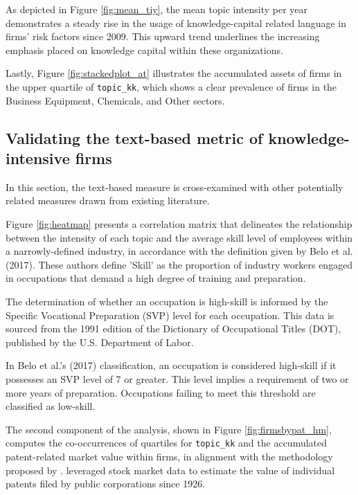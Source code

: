 \documentclass[12pt, letterpaper]{article}
\begin{document}


As depicted in Figure \ref{fig:mean_tiy}, the mean topic intensity per year demonstrates a steady rise in the usage of knowledge-capital related language in firms' risk factors since 2009. This upward trend underlines the increasing emphasis placed on knowledge capital within these organizations.

Lastly, Figure \ref{fig:stackedplot_at} illustrates the accumulated assets of firms in the upper quartile of \texttt{topic\_kk}, which shows a clear prevalence of firms in the Business Equipment, Chemicals, and Other sectors.


\subsection{Validating the text-based metric of knowledge-intensive firms}
  
In this section, the text-based measure \tkk  is cross-examined with other potentially related measures drawn from existing literature.

Figure \ref{fig:heatmap} presents a correlation matrix that delineates the relationship between the intensity of each topic and the average skill level of employees within a narrowly-defined industry, in accordance with the definition given by Belo et al. (2017). These authors define 'Skill' as the proportion of industry workers engaged in occupations that demand a high degree of training and preparation.

The determination of whether an occupation is high-skill is informed by the Specific Vocational Preparation (SVP) level for each occupation. This data is sourced from the 1991 edition of the Dictionary of Occupational Titles (DOT), published by the U.S. Department of Labor. 

In Belo et al.'s (2017) classification, an occupation is considered high-skill if it possesses an SVP level of 7 or greater. This level implies a requirement of two or more years of preparation. Occupations failing to meet this threshold are classified as low-skill.


The second component of the analysis, shown in Figure \ref{fig:firmsbypat_hm}, computes the co-occurrences of quartiles for \texttt{topic\_kk} and the accumulated patent-related market value within firms, in alignment with the methodology proposed by \cite{Kogan2017-fx}. \cite{Kogan2017-fx} leveraged stock market data to estimate the value of individual patents filed by public corporations since 1926. 
\end{document}
